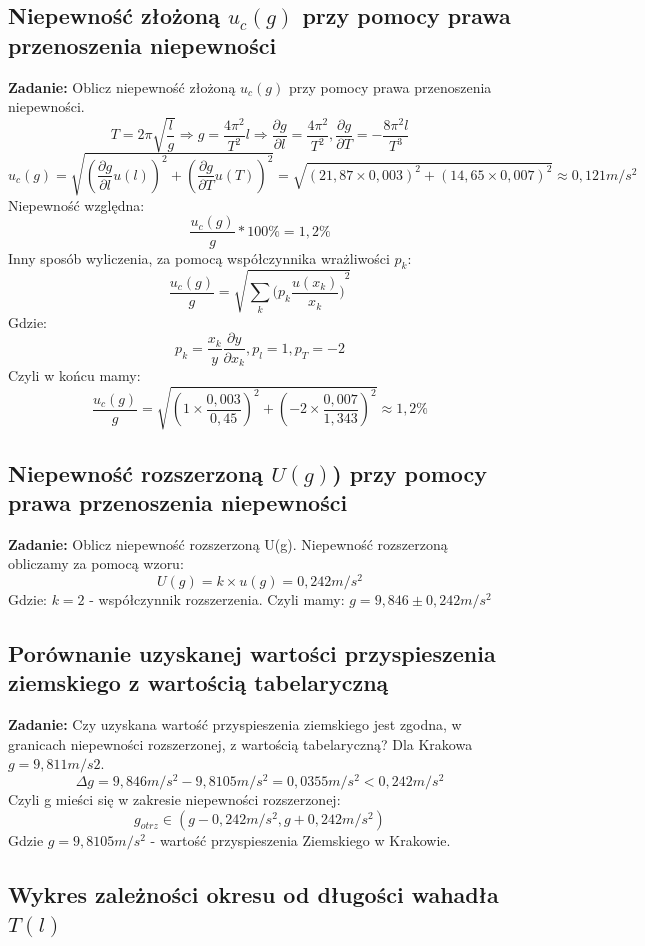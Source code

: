 \documentclass[18pt, twoside]{article}
\begin{document}
    \subsection{Niepewność złożoną \(u_c(g)\) przy pomocy prawa przenoszenia niepewności}
    \textbf{Zadanie:} Oblicz niepewność złożoną \(u_c(g)\) przy pomocy prawa przenoszenia niepewności. \newline
    \[T = 2\pi \sqrt{\frac{l}{g}} \Rightarrow g = \frac{4\pi^2}{T^2}l  \Rightarrow \frac{\partial g}{\partial l} = \frac{4\pi^2}{T^2},\frac{\partial g}{\partial T} = -\frac{8\pi^2l}{T^3} \]
    \[u_c(g) = \sqrt{(\frac{\partial g}{\partial l} u(l))^2 + (\frac{\partial g}{\partial T} u(T))^2} = 
    	\sqrt{(21,87\times0,003)^2 + (14,65\times0,007)^2}
	 \approx 0,121 m/s^2\]
	Niepewność względna:
	\[\frac{u_c(g)}{g} * 100\% = 1,2\% \]
	Inny sposób wyliczenia, za pomocą współczynnika wrażliwości \(p_k\):
	\[\frac{u_c(g)}{g} = \sqrt{\sum_k ({p_k \frac{u(x_k)}{x_k})}^2}\]
	Gdzie: \[p_k = \frac{x_k}{y} \frac{\partial y}{\partial x_k} , p_l = 1 , p_T = -2\] 
	Czyli w końcu mamy:
	\[ \frac{u_c(g)}{g} = \sqrt{(1\times \frac{0,003}{0,45})^2 +(-2\times \frac{0,007}{1,343})^2 } \approx 1,2 \%\]
	\subsection{Niepewność rozszerzoną \(U(g)\)) przy pomocy prawa przenoszenia niepewności}
	\textbf{Zadanie:} Oblicz niepewność rozszerzoną U(g).\newline
	Niepewność rozszerzoną obliczamy za pomocą wzoru:
	\[U(g) = k \times u(g) = 0,242 m/s^2\]
	Gdzie:  \( k = 2\) - współczynnik rozszerzenia.
	Czyli mamy: \(g = 9,846 \pm  0,242 m/s^2\)
	
	\subsection{Porównanie uzyskanej wartości przyspieszenia ziemskiego z wartością tabelaryczną}
	\textbf{Zadanie:} Czy uzyskana wartość przyspieszenia ziemskiego jest zgodna, w granicach niepewności rozszerzonej, z wartością tabelaryczną? Dla Krakowa \(g = 9,811 m/s2\). \newline
	\[\Delta g = 9,846 m/s^2 - 9,8105 m/s^2 = 0,0355 m/s^2 < 0,242 m/s^2\] Czyli g mieści się w zakresie niepewności rozszerzonej:
	\[g_{otrz} \in (g-0,242m/s^2 , g+0,242m/s^2)\] Gdzie \(g=9,8105m/s^2\) - wartość przyspieszenia Ziemskiego w Krakowie.
	
	\subsection{Wykres zależności okresu od długości wahadła \(T(l)\)}
\end{document}
